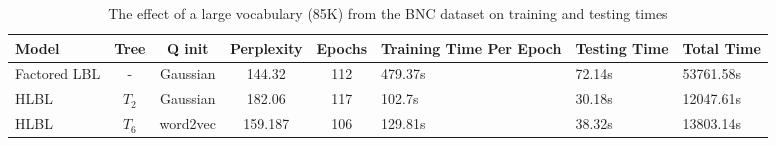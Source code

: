 
\begin{table*} \centering
{}
\begin{tabular}{@{}C{2cm}ccccC{2cm}C{2cm}C{2cm}@{}}\toprule
Model & Tree & Q init & Perplexity & Epochs & Training Time Per Epoch & Testing Time & Total Time\\ 
\midrule
 Factored LBL & - & Gaussian &144.32& 112 & 479.37s & 72.14s & 53761.58s\\
 HLBL& $T_2$ & Gaussian &182.06& 117& 102.7s &30.18s &12047.61s \\
 HLBL & $T_6$ & word2vec &159.187& 106& 129.81s &38.32s &13803.14s \\
\bottomrule
\end{tabular}
\caption{The effect of a large vocabulary (85K) from the BNC dataset on training and testing times}
\label{tab:largeVocabulary}
\end{table*}
  
  
  
